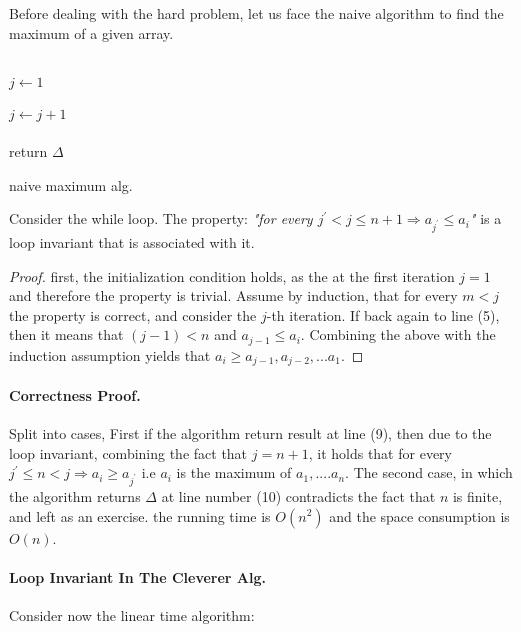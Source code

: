\begin{example} Before dealing with the hard problem, let us face the naive algorithm to find the maximum of a given array.

\begin{algorithm}[H]
{}
 \ \\ 
  { 
        \( j \leftarrow 1 \) \\
        \ \\
         {
        \( j \leftarrow j + 1 \)    
        }
        \\
        \ \\ 
    } 
return \( \Delta \) 
 \caption{naive maximum alg.}
\end{algorithm}

\begin{claim} Consider the while loop. The property: \textit{"for every \(j^\prime < j \le n+1 \Rightarrow a_{j^\prime} \le a_i \)"} is a loop invariant that is associated with it. 
\end{claim}
\begin{proof} first, the initialization condition holds, as the at the first iteration \(j=1\) and therefore the property is trivial.
Assume by induction, that for every \(m < j\) the property is correct, and consider the \(j\)-th iteration. If back again to line (5), then it means that \( (j-1) < n\) and \( a_{j-1} \le a_{i} \). Combining the above with the induction assumption yields that \(a_i \ge a_{j-1},a_{j-2}, ... a_{1}\).    
\end{proof}

\paragraph{Correctness Proof.} Split into cases, First if the algorithm return result at line (9), then due to the loop invariant, combining the fact that \( j = n + 1\), it holds that for every \(j^\prime  \le n < j \Rightarrow a_i \ge a_{j^\prime} \)  i.e \(a_i\) is the maximum of \(a_1, .... a_n \). The second case, in which the algorithm returns \( \Delta \) at line number (10) contradicts the fact that \(n\) is finite, and left as an exercise.  the running time is \( O(n^2) \) and the space consumption is \(O(n)\). 

\paragraph{Loop Invariant In The Cleverer Alg.} Consider now the linear time algorithm:


\end{example}
